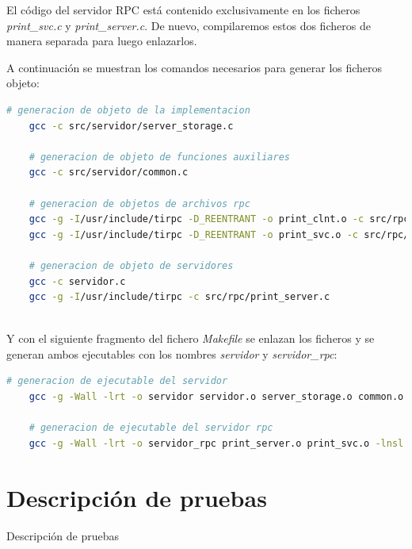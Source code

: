\documentclass[]{article}
\begin{document}
El código del servidor RPC está contenido exclusivamente en los ficheros \textit{print\_svc.c} y \textit{print\_server.c}. De nuevo, compilaremos estos dos ficheros de manera separada para luego enlazarlos.

A continuación se muestran los comandos necesarios para generar los ficheros objeto:

\begin{center}
  \begin{lstlisting}[caption=Compilación de ficheros en ficheros objetos, language=bash]
    # generacion de objeto de la implementacion
    gcc -c src/servidor/server_storage.c
    
    # generacion de objeto de funciones auxiliares
    gcc -c src/servidor/common.c

    # generacion de objetos de archivos rpc
    gcc -g -I/usr/include/tirpc -D_REENTRANT -o print_clnt.o -c src/rpc/print_clnt.c
    gcc -g -I/usr/include/tirpc -D_REENTRANT -o print_svc.o -c src/rpc/print_svc.c

    # generacion de objeto de servidores
    gcc -c servidor.c
    gcc -g -I/usr/include/tirpc -c src/rpc/print_server.c
    
    \end{lstlisting}
\end{center}

Y con el siguiente fragmento del fichero \textit{Makefile} se enlazan los ficheros y se generan ambos ejecutables con los nombres \textit{servidor} y \textit{servidor\_rpc}:

\begin{center}
  \begin{lstlisting}[caption=Generación de ejecutables, language=bash]
    # generacion de ejecutable del servidor
    gcc -g -Wall -lrt -o servidor servidor.o server_storage.o common.o print_clnt.o -lnsl -lpthread -ldl -ltirpc
    
    # generacion de ejecutable del servidor rpc
    gcc -g -Wall -lrt -o servidor_rpc print_server.o print_svc.o -lnsl -lpthread -ldl -ltirpc

    \end{lstlisting}
\end{center}

\section{Descripción de pruebas}
\label{sec:descripcion_de_pruebas}
Descripción de pruebas 
\end{document}
